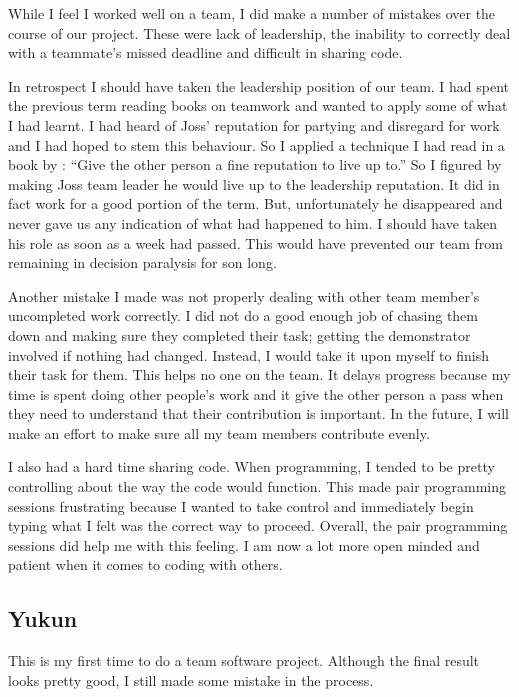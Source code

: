 While I feel I worked well on a team, I did make a number of mistakes
over the course of our project. These were lack of leadership, the
inability to correctly deal with a teammate's missed deadline and
difficult in sharing code.

In retrospect I should have taken the leadership position of our
team. I had spent the previous term reading books on teamwork and
wanted to apply some of what I had learnt. I had heard of Joss'
reputation for partying and disregard for work and I had hoped to stem
this behaviour. So I applied a technique I had read in a book by
\cite{carnegie1936}: ``Give the other person a fine reputation to live
up to.'' So I figured by making Joss team leader he would live up to
the leadership reputation. It did in fact work for a good portion of
the term. But, unfortunately he disappeared and never gave us any
indication of what had happened to him. I should have taken his role
as soon as a week had passed. This would have prevented our team from
remaining in decision paralysis for son long.

Another mistake I made was not properly dealing with other team
member's uncompleted work correctly. I did not do a good enough job of
chasing them down and making sure they completed their task; getting
the demonstrator involved if nothing had changed. Instead, I would
take it upon myself to finish their task for them. This helps no one
on the team. It delays progress because my time is spent doing other
people's work and it give the other person a pass when they need to
understand that their contribution is important. In the future, I will
make an effort to make sure all my team members contribute evenly.

I also had a hard time sharing code. When programming, I tended to be
pretty controlling about the way the code would function. This made
pair programming sessions frustrating because I wanted to take control
and immediately begin typing what I felt was the correct way to
proceed. Overall, the pair programming sessions did help me with this
feeling. I am now a lot more open minded and patient when it comes to
coding with others.

\subsection{Yukun}

This is my first time to do a team software project. Although the
final result looks pretty good, I still made some mistake in the
process.


